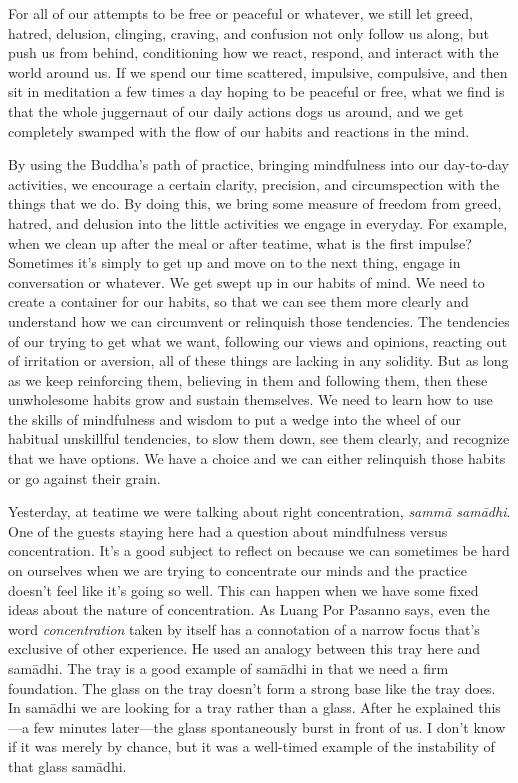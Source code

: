 For all of our attempts to be free or peaceful or whatever, we still 
let greed, hatred, delusion, clinging, craving, and confusion not only 
follow us along, but push us from behind, conditioning how we react, 
respond, and interact with the world around us. If we spend our time 
scattered, impulsive, compulsive, and then sit in meditation a few 
times a day hoping to be peaceful or free, what we find is that the 
whole juggernaut of our daily actions dogs us around, and we get 
completely swamped with the flow of our habits and reactions in the 
mind.

By using the Buddha's path of practice, bringing mindfulness into our 
day-to-day activities, we encourage a certain clarity, precision, and 
circumspection with the things that we do. By doing this, we bring some 
measure of freedom from greed, hatred, and delusion into the little 
activities we engage in everyday. For example, when we clean up after 
the meal or after teatime, what is the first impulse? Sometimes it's 
simply to get up and move on to the next thing, engage in conversation 
or whatever. We get swept up in our habits of mind. We need to create a 
container for our habits, so that we can see them more clearly and 
understand how we can circumvent or relinquish those tendencies. The 
tendencies of our trying to get what we want, following our views and 
opinions, reacting out of irritation or aversion, all of these things 
are lacking in any solidity. But as long as we keep reinforcing them, 
believing in them and following them, then these unwholesome habits 
grow and sustain themselves. We need to learn how to use the skills of 
mindfulness and wisdom to put a wedge into the wheel of our habitual 
unskillful tendencies, to slow them down, see them clearly, and 
recognize that we have options. We have a choice and we can either 
relinquish those habits or go against their grain.


Yesterday, at teatime we were talking about right concentration, 
\emph{sammā samādhi}. One of the guests staying here had a question 
about mindfulness versus concentration. It's a good subject to reflect 
on because we can sometimes be hard on ourselves when we are trying to 
concentrate our minds and the practice doesn't feel like it's going so 
well. This can happen when we have some fixed ideas about the nature of 
concentration. As Luang Por Pasanno says, even the word 
\emph{concentration} taken by itself has a connotation of a narrow 
focus that's exclusive of other experience. He used an analogy between 
this tray here and samādhi. The tray is a good example of samādhi in 
that we need a firm foundation. The glass on the tray doesn't form a 
strong base like the tray does. In samādhi we are looking for a tray 
rather than a glass. After he explained this---a few minutes 
later---the glass spontaneously burst in front of us. I don't know if 
it was merely by chance, but it was a well-timed example of the 
instability of that glass samādhi.

